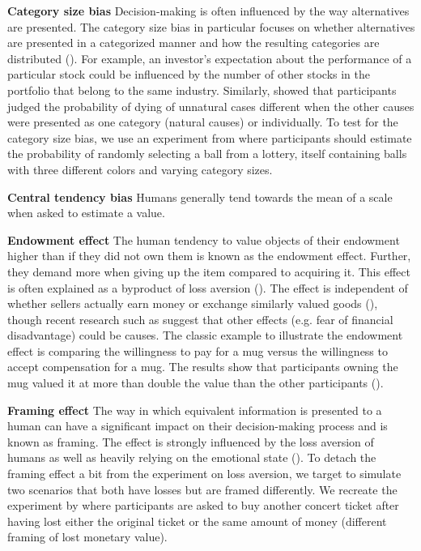 \par \textbf{Category size bias} Decision-making is often influenced by the way alternatives are presented. The category size bias in particular focuses on whether alternatives are presented in a categorized manner and how the resulting categories are distributed (\cite{isaac2014judging}). For example, an investor's expectation about the performance of a particular stock could be influenced by the number of other stocks in the portfolio that belong to the same industry. Similarly, \cite{tversky1994support} showed that participants judged the probability of dying of unnatural cases different when the other causes were presented as one category (natural causes) or individually. To test for the category size bias, we use an experiment from \cite{isaac2014judging} where participants should estimate the probability of randomly selecting a ball from a lottery, itself containing balls with three different colors and varying category sizes.

\par \textbf{Central tendency bias} Humans generally tend towards the mean of a scale when asked to estimate a value.

\par \textbf{Endowment effect} The human tendency to value objects of their endowment higher than if they did not own them is known as the endowment effect. Further, they demand more when giving up the item compared to acquiring it. This effect is often explained as a byproduct of loss aversion (\cite{kahneman1990experimental}). The effect is independent of whether sellers actually earn money or exchange similarly valued goods (\cite{knetsch1989endowment}), though recent research such as \cite{weaver2012reference} suggest that other effects (e.g. fear of financial disadvantage) could be causes. The classic example to illustrate the endowment effect is comparing the willingness to pay for a mug versus the willingness to accept compensation for a mug. The results show that participants owning the mug valued it at more than double the value than the other participants (\cite{kahneman1990experimental}).

\par \textbf{Framing effect} The way in which equivalent information is presented to a human can have a significant impact on their decision-making process and is known as framing. The effect is strongly influenced by the loss aversion of humans as well as heavily relying on the emotional state (\cite{tversky1981framing}). To detach the framing effect a bit from the experiment on loss aversion, we target to simulate two scenarios that both have losses but are framed differently. We recreate the experiment by \cite{tversky1981framing} where participants are asked to buy another concert ticket after having lost either the original ticket or the same amount of money (different framing of lost monetary value).

